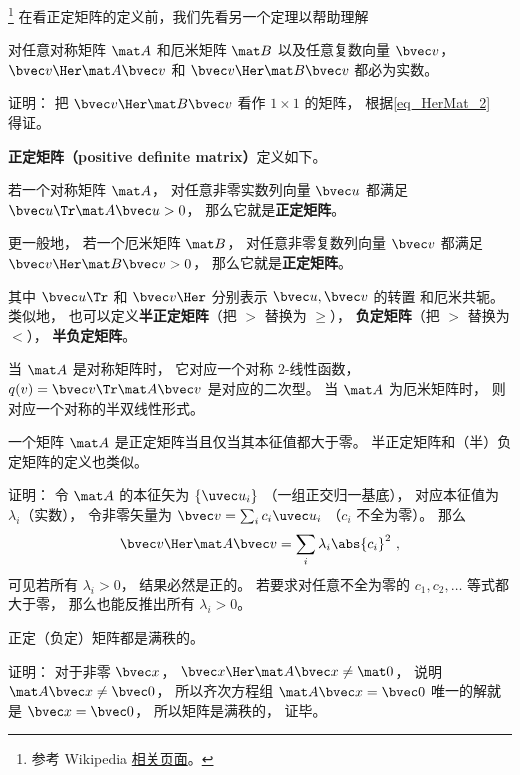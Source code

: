 

\footnote{参考 Wikipedia \href{https://en.wikipedia.org/wiki/Definite_matrix}{相关页面}。}
在看正定矩阵的定义前，我们先看另一个定理以帮助理解

\begin{theorem}{}
对任意对称矩阵 $\mat A$ 和厄米矩阵 $\mat B$ 以及任意复数向量 $\bvec v$， $\bvec v\Her \mat A \bvec v$ 和 $\bvec v\Her \mat B \bvec v$ 都必为实数。
\end{theorem}
证明： 把 $\bvec v\Her \mat B \bvec v$ 看作 $1\times 1$ 的矩阵， 根据\autoref{eq_HerMat_2}~ 得证。

\textbf{正定矩阵（positive definite matrix）}定义如下。
\begin{definition}{}
若一个对称矩阵 $\mat A$， 对任意非零实数列向量 $\bvec u$ 都满足 $\bvec u\Tr \mat A \bvec u > 0$， 那么它就是\textbf{正定矩阵}。

更一般地， 若一个厄米矩阵 $\mat B$， 对任意非零复数列向量 $\bvec v$ 都满足 $\bvec v\Her \mat B \bvec v > 0$， 那么它就是\textbf{正定矩阵}。
\end{definition}
其中 $\bvec u\Tr$ 和 $\bvec v\Her$ 分别表示 $\bvec u, \bvec v$ 的转置 和厄米共轭。 类似地， 也可以定义\textbf{半正定矩阵}（把 $>$ 替换为 $\geqslant$）， \textbf{负定矩阵}（把 $>$ 替换为 $<$）， \textbf{半负定矩阵}。

当 $\mat A$ 是对称矩阵时， 它对应一个对称 2-线性函数， $q(v) = \bvec v\Tr \mat A \bvec v$ 是对应的二次型。 当 $\mat A$ 为厄米矩阵时， 则对应一个对称的半双线性形式。

\begin{theorem}{}
一个矩阵 $\mat A$ 是正定矩阵当且仅当其本征值都大于零。 半正定矩阵和（半）负定矩阵的定义也类似。
\end{theorem}

证明： 令 $\mat A$ 的本征矢为 $\{\uvec u_i\}$ （一组正交归一基底）， 对应本征值为 $\lambda_i$（实数）， 令非零矢量为 $\bvec v = \sum_i c_i \uvec u_i$ （$c_i$ 不全为零）。 那么
\begin{equation}
\bvec v\Her \mat A \bvec v = \sum_i \lambda_i \abs{c_i}^2~,
\end{equation}
可见若所有 $\lambda_i > 0$， 结果必然是正的。 若要求对任意不全为零的 $c_1,c_2,\dots$ 等式都大于零， 那么也能反推出所有 $\lambda_i > 0$。

\begin{theorem}{}
正定（负定）矩阵都是满秩的。
\end{theorem}
证明： 对于非零 $\bvec x$， $\bvec x\Her \mat A \bvec x \ne \mat 0$， 说明 $\mat A\bvec x \ne \bvec 0$， 所以齐次方程组 $\mat A\bvec x = \bvec 0$ 唯一的解就是 $\bvec x = \bvec 0$， 所以矩阵是满秩的， 证毕。

